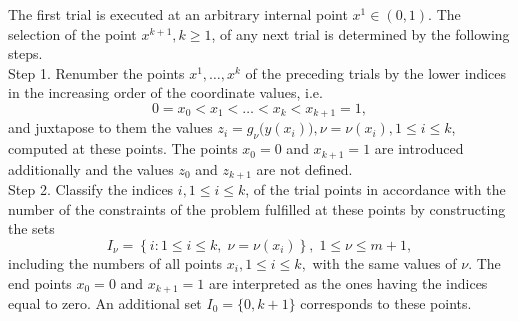 \documentclass[twocolumn]{svjour3}          %
\begin{document}
	The first trial is executed at an arbitrary internal point $x^1 \in (0,1)$. The selection of the point $ x^{k+1}, k \geq 1$, of any next trial is determined by the following steps. \\
Step 1. Renumber the points $x^1, \ldots, x^k$ of the preceding trials by the lower indices in the increasing order of the coordinate values, i.e.
$$
	0=x_0<x_1<\dots <x_k<x_{k+1}=1,
$$
and juxtapose to them the values $z_i=g_{\nu}\big(y(x_i)\big),\nu=\nu(x_i), 1 \leq i \leq k$, computed at these points. The points $x_0=0$ and $x_{k+1}=1$ are introduced additionally and the values $z_0$ and $z_{k+1}$ are not defined. \\
Step 2. Classify the indices $i, 1 \leq i \leq k$, of the trial points in accordance with the number of the constraints of the problem fulfilled at these points by constructing the sets
$$
	I_\nu =\left\{i:1 \leq i \leq k, \; \nu=\nu(x_i) \right\}, \; 1 \leq \nu \leq m+1,
$$
including the numbers of all points $x_i, 1 \leq i \leq k,$ with the same values of $\nu$. The end points $x_0=0$ and $x_{k+1}=1$ are interpreted as the ones having the indices equal to zero. An additional set $I_0=\{0, k+1\}$ corresponds to these points.
\end{document}
